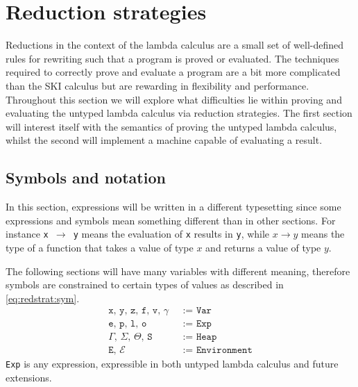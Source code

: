 \section{Reduction strategies}
Reductions in the context of the lambda calculus are a small set of well-defined rules for rewriting such that a program is proved or evaluated.
The techniques required to correctly prove and evaluate a program are a bit more complicated than the SKI calculus but are rewarding in flexibility and performance.
Throughout this section we will explore what difficulties lie within proving and evaluating the untyped lambda calculus via reduction strategies.
The first section will interest itself with the semantics of proving the untyped lambda calculus, whilst the second will implement a machine capable of evaluating a result.

\subsection{Symbols and notation}
In this section, expressions will be written in a different typesetting since some expressions and symbols mean something different than in other sections.
For instance \texttt{x $\rightarrow$ y} means the evaluation of \texttt{x} results in \texttt{y}, while $x \rightarrow y$ means the type of a function that takes a value of type $x$ and returns a value of type $y$.

The following sections will have many variables with different meaning, therefore symbols are constrained to certain types of values as described in \autoref{eq:redstrat:sym}.
\begin{align}
  \texttt{x, y, z, f, v, $\gamma$ }&\texttt{:= Var}\label{eq:redstrat:sym}\\
  \texttt{e, p, l, o }&\texttt{:= Exp}\tag*{}\\
  \texttt{$\Gamma$, $\Sigma$, $\Theta$, S }&\texttt{:= Heap}\tag*{}\\
  \texttt{E, $\mathcal{E}$ }&\texttt{:= Environment}\tag*{}
\end{align}
\texttt{Exp} is any expression, expressible in both untyped lambda calculus and future extensions.



